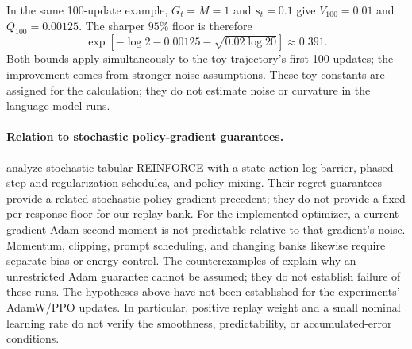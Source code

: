 In the same 100-update example, $G_t=M=1$ and $s_t=0.1$ give
$V_{100}=0.01$ and $Q_{100}=0.00125$. The sharper $95\%$ floor is therefore
\[
 \exp\!\left[-\log2-0.00125-\sqrt{0.02\log20}\right]\approx0.391.
\]
Both bounds apply simultaneously to the toy trajectory's first 100 updates;
the improvement comes from stronger noise assumptions. These toy constants are assigned for the calculation; they do not
estimate noise or curvature in the language-model runs.

\paragraph{Relation to stochastic policy-gradient guarantees.}
\citet{zhang2021reinforce} analyze stochastic tabular REINFORCE with a
state-action log barrier, phased step and regularization schedules, and
policy mixing. Their regret guarantees provide a related stochastic
policy-gradient precedent; they do not provide a fixed per-response floor
for our replay bank. For the implemented optimizer, a current-gradient Adam
second moment is not predictable relative to that gradient's noise.
Momentum, clipping, prompt scheduling, and changing banks likewise require
separate bias or energy control. The counterexamples of
\citet{reddi2018adam} explain why an unrestricted Adam guarantee cannot be
assumed; they do not establish failure of these runs. The hypotheses above
have not been established for the experiments' AdamW/PPO updates. In
particular, positive replay weight and a small nominal learning rate do not
verify the smoothness, predictability, or accumulated-error conditions.

